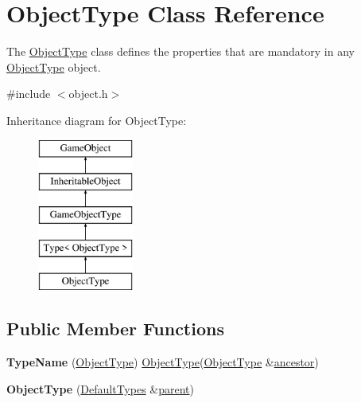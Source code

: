 \hypertarget{class_object_type}{\section{\-Object\-Type \-Class \-Reference}
\label{class_object_type}
}


\-The \hyperlink{class_object_type}{\-Object\-Type} class defines the properties that are mandatory in any \hyperlink{class_object_type}{\-Object\-Type} object.  




{\ttfamily \#include $<$object.\-h$>$}

\-Inheritance diagram for \-Object\-Type\-:\begin{figure}[H]
\begin{center}
\leavevmode
\includegraphics[height=5.000000cm]{class_object_type}
\end{center}
\end{figure}
\subsection*{\-Public \-Member \-Functions}
\begin{DoxyCompactItemize}
\item 
\hypertarget{class_object_type_a2d7216c1542f39514727826f0a728143}{{\bfseries \-Type\-Name} (\hyperlink{class_object_type}{\-Object\-Type}) \hyperlink{class_object_type}{\-Object\-Type}(\hyperlink{class_object_type}{\-Object\-Type} \&\hyperlink{class_inheritable_object_ac87a3c55ca4be252c527a29fe162bb15}{ancestor})}\label{class_object_type_a2d7216c1542f39514727826f0a728143}

\item 
\hypertarget{class_object_type_ab0c8f836fb9a204d6a8c5fc430988135}{{\bfseries \-Object\-Type} (\hyperlink{class_default_types}{\-Default\-Types} \&\hyperlink{class_game_object_af3deaf39cde23c189765634e32e95bb4}{parent})}\label{class_object_type_ab0c8f836fb9a204d6a8c5fc430988135}

\end{DoxyCompactItemize}


